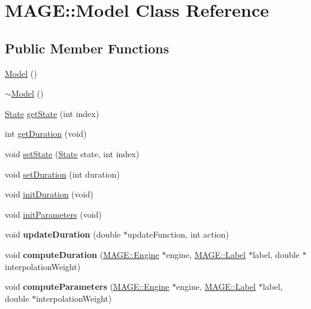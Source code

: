 \hypertarget{class_m_a_g_e_1_1_model}{\section{M\-A\-G\-E\-:\-:Model Class Reference}
\label{class_m_a_g_e_1_1_model}
}
\subsection*{Public Member Functions}
\begin{DoxyCompactItemize}
\item 
\hyperlink{class_m_a_g_e_1_1_model_ab8aede0293060f9f2a2987b97e3b866f}{Model} ()
\item 
\hyperlink{class_m_a_g_e_1_1_model_a1ed2323cc8bf49132ccde2cc5ca8005e}{$\sim$\-Model} ()
\item 
\hyperlink{struct_m_a_g_e_1_1_state}{State} \hyperlink{class_m_a_g_e_1_1_model_a98f78c5746a9d3f6c58564e68fc5d256}{get\-State} (int index)
\item 
int \hyperlink{class_m_a_g_e_1_1_model_a2400f49e3b5901ed04436fcee9b49641}{get\-Duration} (void)
\item 
void \hyperlink{class_m_a_g_e_1_1_model_a4c3af53691987ae0c8d3f0d921da3f61}{set\-State} (\hyperlink{struct_m_a_g_e_1_1_state}{State} state, int index)
\item 
void \hyperlink{class_m_a_g_e_1_1_model_a59f493069f299cd68862c954791bcf34}{set\-Duration} (int duration)
\item 
void \hyperlink{class_m_a_g_e_1_1_model_a9d8c1c2a881e496c9e49464b595b7a81}{init\-Duration} (void)
\item 
void \hyperlink{class_m_a_g_e_1_1_model_a0da8e90094bcf69179718334b1ad13b5}{init\-Parameters} (void)
\item 
\hypertarget{class_m_a_g_e_1_1_model_a90a47244e550dfaf403ab9e28175af86}{void {\bfseries update\-Duration} (double $\ast$update\-Function, int action)}\label{class_m_a_g_e_1_1_model_a90a47244e550dfaf403ab9e28175af86}

\item 
\hypertarget{class_m_a_g_e_1_1_model_af32192860c3f1a173d45ee9cb529a976}{void {\bfseries compute\-Duration} (\hyperlink{class_m_a_g_e_1_1_engine}{M\-A\-G\-E\-::\-Engine} $\ast$engine, \hyperlink{class_m_a_g_e_1_1_label}{M\-A\-G\-E\-::\-Label} $\ast$label, double $\ast$interpolation\-Weight)}\label{class_m_a_g_e_1_1_model_af32192860c3f1a173d45ee9cb529a976}

\item 
\hypertarget{class_m_a_g_e_1_1_model_a1c14789a6c16843aecddc12886f986b3}{void {\bfseries compute\-Parameters} (\hyperlink{class_m_a_g_e_1_1_engine}{M\-A\-G\-E\-::\-Engine} $\ast$engine, \hyperlink{class_m_a_g_e_1_1_label}{M\-A\-G\-E\-::\-Label} $\ast$label, double $\ast$interpolation\-Weight)}\label{class_m_a_g_e_1_1_model_a1c14789a6c16843aecddc12886f986b3}


\end{DoxyCompactItemize}
